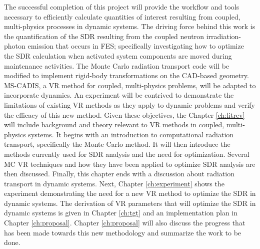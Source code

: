 The successful completion of this project will provide the workflow and tools
necessary to efficiently calculate quantities of interest resulting from
coupled, multi-physics processes in dynamic systems.  
The driving force behind this work is the quantification of the
SDR resulting from the coupled neutron
irradiation-photon emission that occurs in FES;
specifically investigating how to optimize the SDR calculation when%
activated system components are moved during maintenance activities.
The Monte Carlo radiation transport code will
be modified to implement rigid-body transformations on the CAD-based geometry.
MS-CADIS, a VR method for coupled, multi-physics problems, will be adapted to
incorporate dynamics.  An experiment will be contrived to demonstrate the
limitations of existing VR methods as they apply to dynamic problems and verify
the efficacy of this new method.  Given these objectives, the Chapter \ref{ch:litrev}
will include background and theory relevant to VR methods in coupled,
multi-physics systems.  It begins with an introduction to computational
radiation transport, specifically the Monte Carlo method.
It will then introduce the methods currently used for SDR analysis and the
need for optimization.  Several MC VR techniques and how they have been applied
 to optimize SDR analysis are then discussed.
Finally, this chapter ends with a discussion about radiation transport in
dynamic systems.  
Next, Chapter \ref{ch:experiment} shows the experiment demonstrating the need
for a new VR method to optimize the SDR in dynamic systems.  The derivation of
VR parameters that will optimize the SDR in dynamic systems is given in
Chapter \ref{ch:tgt} and an implementation plan in Chapter \ref{ch:proposal}.
Chapter \ref{ch:proposal} will also discuss
the progress that has been made towards this new methodology and summarize the
work to be done.

